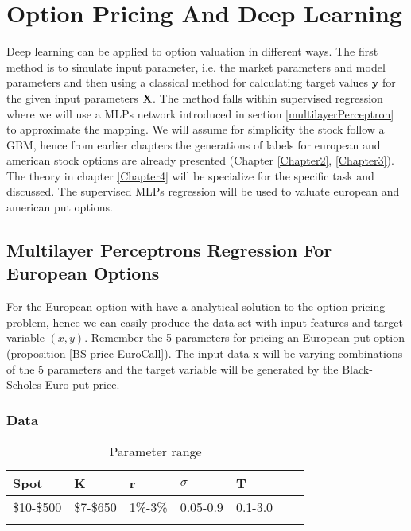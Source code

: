 
\chapter{Option Pricing And Deep Learning} %

\label{Chapter5} %

Deep learning can be applied to option valuation in different ways. The first method is to simulate input parameter, i.e. the market parameters and model parameters and then using a classical method for calculating target values $\bm{y}$ for the given input parameters $\mathbf{X}$. The method falls within supervised regression where we will use a MLPs network introduced in section \ref{multilayerPerceptron} to approximate the mapping. We will assume for simplicity the stock follow a GBM, hence from earlier chapters the generations of labels for european and american stock options are already presented (Chapter \ref{Chapter2}, \ref{Chapter3}). The theory in chapter \ref{Chapter4} will be specialize for the specific task and discussed. The supervised MLPs regression will be used to valuate european and american put options.


\section{Multilayer Perceptrons Regression For European Options}
For the European option with have a analytical solution to the option pricing problem, hence we can easily produce the data set with input features and target variable $(x,y)$. Remember the 5 parameters for pricing an European put option (proposition \ref{BS-price-EuroCall}). The input data x will be varying combinations of the 5 parameters and the target variable will be generated by the Black-Scholes Euro put price. 

\subsection{Data}

\begin{table}[th]
\caption{Parameter range}
\label{tab:treatments}
\centering
\begin{tabular}{l l l l l l l }
\toprule
\textbf{Spot} &  \textbf{K} & \textbf{r} & \textbf{$\sigma$} & \textbf{T} \\
\midrule
\$10-\$500 & \$7-\$650 & 1\%-3\% & 0.05-0.9 & 0.1-3.0\\ 
\bottomrule\\
\end{tabular}
\end{table}

